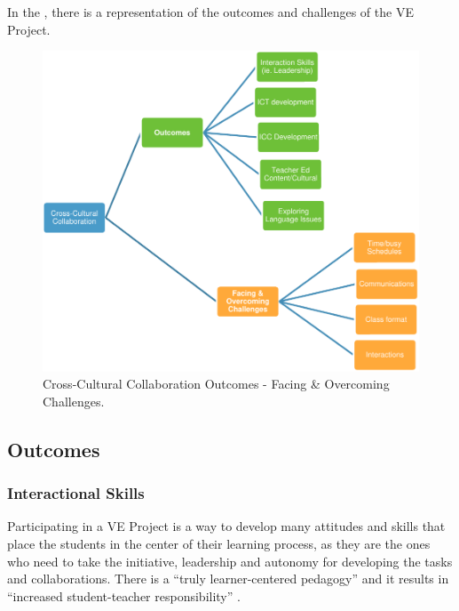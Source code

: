 In the , there is a representation of the outcomes and
challenges of the VE Project.
	
	
\begin{figure}[!htpb]
\centering
\begin{minipage}{0.66\textwidth}
\includegraphics[width=\textwidth]{figure01.pdf}
\caption{Cross-Cultural Collaboration Outcomes - Facing \& Overcoming Challenges.}
\label{fig-01}
\end{minipage}
\end{figure}


\subsection{Outcomes}\label{sub-sec-outcomes}
\subsubsection{Interactional Skills}\label{sub-sub-sec-interactional}

Participating in a VE Project is a way to develop many attitudes and
skills that place the students in the center of their learning process,
as they are the ones who need to take the initiative, leadership and
autonomy for developing the tasks and collaborations. There is a \enquote{truly
learner-centered pedagogy} and it results in \enquote{increased
student-teacher responsibility} \cite{sadler2016twelve}.
		
